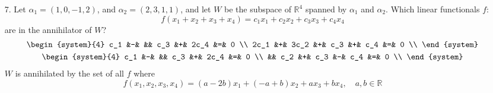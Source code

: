 \documentclass{article}
\begin{document}
\begin{enumerate}[listparindent=\parindent]
\item[7.] Let \(\alpha_1 = (1, 0, -1, 2)\), and \(\alpha_2 = (2, 3, 1, 1)\),
    and let \(W\) be the subspace of \(\mathbb{R}^4\) spanned by \(\alpha_1\) and \(\alpha_2\).
    Which linear functionals \(f\):
    \[ f(x_1 + x_2 + x_3 + x_4) = c_1x_1 + c_2x_2 + c_3x_3 + c_4x_4 \]
    are in the annihilator of \(W\)?
    \begin{gather*}
        \begin{system}{4}
            c_1 &-& && c_3 &+& 2c_4 &=& 0 \\
            2c_1 &+& 3c_2 &+& c_3 &+& c_4 &=& 0 \\
        \end{system} \\
        \begin{system}{4}
            c_1 &-& && c_3 &+& 2c_4 &=& 0 \\
            && c_2 &+& c_3 &-& c_4 &=& 0 \\
        \end{system}
    \end{gather*} \(W\) is annihilated by the set of all \(f\) where \[ f(x_1, x_2, x_3, x_4) = (a - 2b)x_1 + (-a + b)x_2 + ax_3 + bx_4,\quad a, b \in \mathbb{R} \]


\end{enumerate}
\end{document}
